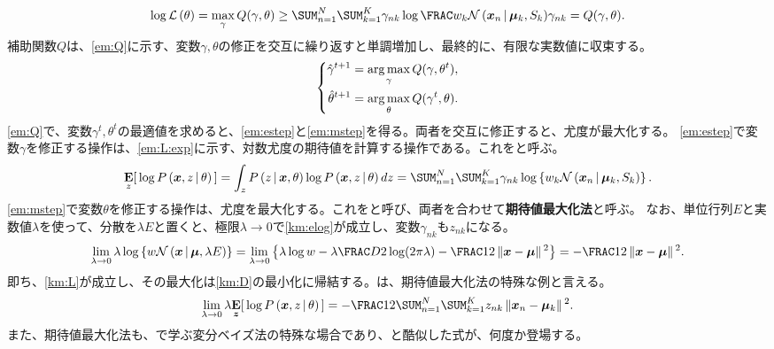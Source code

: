 \documentclass[10pt,a4paper]{book}
\begin{document}
%
\begin{equation}
\label{eq:em:jensen}
\log \Lk{\theta} =
\max_\gamma Q(\gamma,\theta) \geq
\sum_{n=1}^N \sum_{k=1}^K \gamma_{nk} \log \frac{w_k \Nd{\bm{x}_n}{\bm{\mu}_k,S_k}}{\gamma_{nk}} =
Q(\gamma,\theta).
\end{equation}
%
補助関数$Q$は、\eqref{em:Q}に示す、変数$\gamma,\theta$の修正を交互に繰り返すと単調増加し、最終的に、有限な実数値に収束する。
%
\begin{equation}
\label{eq:em:Q}
\left\{
\begin{aligned}
\hat{\gamma}^{t+1} &= \operatorname*{arg\,max}_{\gamma} Q(\gamma,\theta^t), \\
\hat{\theta}^{t+1} &= \operatorname*{arg\,max}_{\theta} Q(\gamma^t,\theta).
\end{aligned}
\right.
\end{equation}
%
\eqref{em:Q}で、変数$\gamma^t,\theta^t$の最適値を求めると、\eqref{em:estep}と\eqref{em:mstep}を得る。両者を交互に修正すると、尤度が最大化する。
\eqref{em:estep}で変数$\gamma$を修正する操作は、\eqref{em:L:exp}に示す、対数尤度の期待値を計算する操作である。これを\Estep{}と呼ぶ。
%
\begin{equation}
\label{eq:em:L:exp}
\E[z]{\log \Prob{\bm{x},z}[\theta]} =
\int_z \Prob{z}[\bm{x},\theta] \log \Prob{\bm{x},z}[\theta] dz =
\sum_{n=1}^N \sum_{k=1}^K \gamma_{nk} \log \seq{w_k \Nd{\bm{x}_n}{\bm{\mu}_k,S_k}}.
\end{equation}
%
\eqref{em:mstep}で変数$\theta$を修正する操作は、尤度を最大化する。これを\Mstep{}と呼び、両者を合わせて\textbf{期待値最大化法}と呼ぶ。
なお、単位行列$E$と実数値$\lambda$を使って、分散を$\lambda E$と置くと、極限$\lambda\to0$で\eqref{km:elog}が成立し、変数$\gamma_{nk}$も$z_{nk}$になる。
%
\begin{equation}
\label{eq:km:elog}
\lim_{\lambda\to0} \lambda\log \seq{w \Nd{\bm{x}}{\bm{\mu},\lambda E}} =
\lim_{\lambda\to0} \seq{\lambda\log w - \lambda\frac{D}{2} \log (2\pi\lambda) - \frac{1}{2} \norm{\bm{x}-\bm{\mu}}^2} =
-\frac{1}{2} \norm{\bm{x}-\bm{\mu}}^2.
\end{equation}
%
即ち、\eqref{km:L}が成立し、その最大化は\eqref{km:D}の最小化に帰結する。\kmean{}は、期待値最大化法の特殊な例と言える。
%
\begin{equation}
\label{eq:km:L}
\lim_{\lambda\to0} \lambda \E[\bm{z}]{\log \Prob{\bm{x},z}[\theta]} =
-\frac{1}{2} \sum_{n=1}^N \sum_{k=1}^K z_{nk} \norm{\bm{x}_n-\bm{\mu}_k}^2.
\end{equation}
%
また、期待値最大化法も、で学ぶ変分ベイズ法の特殊な場合であり、と酷似した式が、何度か登場する。
\end{document}
